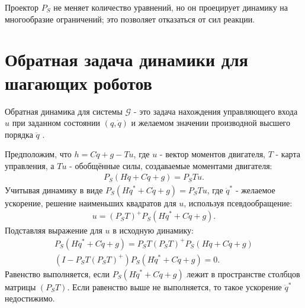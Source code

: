 Проектор ${P}_S$ не меняет количество уравнений, но он проецирует динамику на многообразие ограничений; это позволяет отказаться от сил реакции.
%
\section{Обратная задача динамики для шагающих роботов}\label{sec:ch2/sect4}

Обратная динамика для системы $\mathcal{G}$ - это задача нахождения управляющего входа ${u}$ при заданном состоянии $({q}, \dot{{q}})$ и желаемом значении производной высшего порядка $\ddot{{q}}$ \cite{Righetti2011}.
\begin{comment}
Динамика свободно плавающего робота с жёстким телом, подверженного внешним ограничениям, в общем случае задаётся следующим образом
\begin{equation}
	M \ddot{q} +h =S\T\tau + J_c\T \lambda,
\end{equation}
при $k$ ограничениях
\begin{equation}
	J_c \ddot{q} = b(q,\dot{q}),
\end{equation}
где $M \in \mathbb{R}^{n+6 \times n+6}$ - матрица инерции динамики жёсткого тела, $h \in \mathbb{R}^{n+6}$ - обобщённый вектор силы, содержащий эффекты Кориолиса, центробежные и гравитационные эффекты, $\tau \in \mathbb{R}^{n}$ - вектор воздействия и $S \in \mathbb{R}^{n \times n+6}$ - матрица выбора соединений, отражающая недостаточность действия - например, для большинства роботов с плавающей базой S будет матрицей тождества в первой подматрице $n \times n$, а в остальных местах - нули. 
$J_c \in \mathbb{R}^{k \times n+6}$ - Якобиан $k$ ограничений c $\lambda \in \mathbb{R}^{k}$ множителями Лагранжа, соответствующих ограничивающим силам.
\end{comment}
Предположим, что ${h} = {C}\dot{{q}} + {g} - {T}{u}$, где ${u}$ - вектор моментов двигателя, ${T}$ - карта управления, а ${T}{u}$ - обобщённые силы, создаваемые моментами двигателя:
%
\begin{align}
	{P}_S({H}\ddot{{q}} + {C}\dot{{q}}+ {g}) = {P}_S{T}{u}.
\end{align}
%
Учитывая динамику в виде ${P}_S({H}\ddot{{q}}^* + {C}\dot{{q}}+ {g}) = {P}_S{T}{u}$, где $\ddot{{q}}^*$ - желаемое ускорение, решение наименьших квадратов для ${u}$, используя псевдообращение:
%
\begin{align}
	{u}
	=
	({P}_S{T})^+{P}_S({H}\ddot{{q}}^* + {C}\dot{{q}}+ {g}).
\end{align}
%
Подставляя выражение для ${u}$ в исходную динамику:
%
\begin{align}
	{P}_S({H}\ddot{{q}}^* + {C}\dot{{q}}+ {g}) = {P}_S{T}({P}_S{T})^+{P}_S({H}\ddot{{q}} + {C}\dot{{q}}+ {g})
	\\
	({I}-{P}_S{T}({P}_S{T})^+){P}_S({H}\ddot{{q}}^* + {C}\dot{{q}}+ {g}) = 0.
\end{align}
%
Равенство выполняется, если ${P}_S({H}\ddot{{q}}^* + {C}\dot{{q}}+ {g})$ лежит в пространстве столбцов матрицы $({P}_S{T})$.
Если равенство выше не выполняется, то такое ускорение $\ddot{{q}}^*$ недостижимо.

